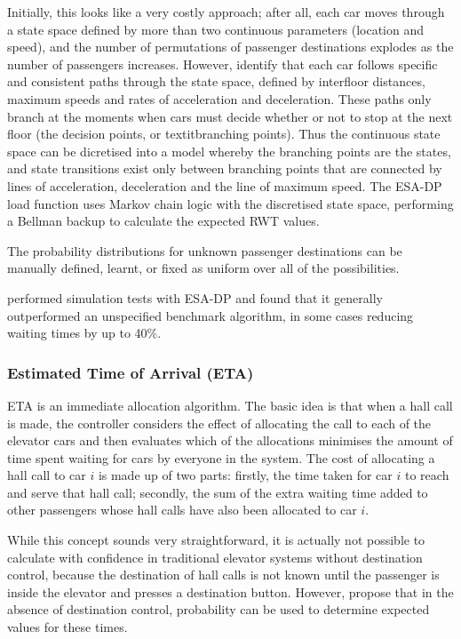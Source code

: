 \documentclass{UoYCSproject}
\begin{document}
Initially, this looks like a very costly approach; after all, each car moves through a state space defined by more than two continuous parameters (location and speed), and the number of permutations of passenger destinations explodes as the number of passengers increases.  However, \citet{Nikovski2003} identify that each car follows specific and consistent paths through the state space, defined by interfloor distances, maximum speeds and rates of acceleration and deceleration.  These paths only branch at the moments when cars must decide whether or not to stop at the next floor (the decision points, or textit{branching points}).  Thus the continuous state space can be dicretised into a model whereby the branching points are the states, and state transitions exist only between branching points that are connected by lines of acceleration, deceleration and the line of maximum speed.  The ESA-DP load function uses Markov chain logic with the discretised state space, performing a Bellman backup to calculate the expected RWT values.

The probability distributions for unknown passenger destinations can be manually defined, learnt, or fixed as uniform over all of the possibilities.

\citet{Nikovski2003} performed simulation tests with ESA-DP and found that it generally outperformed an unspecified benchmark algorithm, in some cases reducing waiting times by up to 40\%.

\subsubsection{Estimated Time of Arrival (ETA) \citep{Rong2003}}
\label{LitRevETA}

ETA is an immediate allocation algorithm.  The basic idea is that when a hall call is made, the controller considers the effect of allocating the call to each of the elevator cars and then evaluates which of the allocations minimises the amount of time spent waiting for cars by everyone in the system.  The cost of allocating a hall call to car $i$ is made up of two parts: firstly, the time taken for car $i$ to reach and serve that hall call; secondly, the sum of the extra waiting time added to other passengers whose hall calls have also been allocated to car $i$.

While this concept sounds very straightforward, it is actually not possible to calculate with confidence in traditional elevator systems without destination control, because the destination of hall calls is not known until the passenger is inside the elevator and presses a destination button.  However, \citet{Rong2003} propose that in the absence of destination control, probability can be used to determine expected values for these times.
\end{document}
